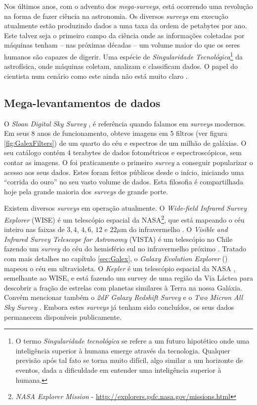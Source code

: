 Nos últimos anos, com o advento dos {\em mega-surveys}, está ocorrendo uma
revolução na forma de fazer ciência na astronomia. Os diversos {\em surveys} em
execução atualmente estão produzindo dados a uma taxa da ordem de petabytes por
ano. Este talvez seja o primeiro campo da ciência onde as informações coletadas
por máquinas tenham -- nas próximas décadas -- um volume maior do que os seres
humanos são capazes de digerir. Uma espécie de {\em Singularidade
Tecnológica}\footnote{O termo {\em Singularidade tecnológica} se refere a um
futuro hipotético onde uma inteligência superior à humana emerge através da
tecnologia. Qualquer previsão após tal fato se torna muito difícil, algo similar
a um horizonte de eventos, dada a dificuldade em entender uma inteligência
superior à humana.} da astrofísica, onde máquinas coletam, analizam e
classificam dados. O papel do cientista num cenário como este ainda não está
muito claro \citep{Norris2010}.

\subsection{Mega-levantamentos de dados}

O {\em Sloan Digital Sky Survey} \citep[\SDSS; ][]{York2000}, é referência
quando falamos em {\em surveys} modernos. Em seus 8 anos de funcionamento, obteve
imagens em 5 filtros (ver figura \ref{fig:GalexFilters}) de um quarto do céu e
espectros de um milhão de galáxias. O seu catálogo contém 4 terabytes de dados
fotométricos e espectroscópicos, sem contar as imagens. O \SDSS foi praticamente
o primeiro {\em survey} a conseguir popularizar o acesso aos seus dados. Estes
foram feitos públicos desde o início, iniciando uma ``corrida do ouro'' no seu
vasto volume de dados. Esta filosofia é compartilhada hoje pela grande maioria
dos {\em surveys} de grande porte.

Existem diversos {\em surveys} em operação atualmente. O {\em Wide-field
Infrared Survey Explorer} (WISE) é um telescópio espacial da NASA\footnote{{\em
NASA Explorer Mission} - \url{http://explorers.gsfc.nasa.gov/missions.html}},
que está mapeando o céu inteiro nas faixas de $3,4$, $4,6$, $12$ e $22\mu$m do
infravermelho \citep{Wright2010}. O {\em Visible and Infrared Survey Telescope
for Astronomy} (VISTA) é um telescópio no Chile fazendo um {\em survey} do céu
do hemisfério sul no infravermelho próximo \citep{Born2010}. Tratado com mais
detalhes no capítulo \ref{sec:Galex}, o {\em Galaxy Evolution Explorer} (\galex)
mapeou o céu em ultravioleta. O {\em Kepler} é um telescópio espacial da NASA
\citep{Borucki2010}, semelhante ao WISE, e está fazendo um survey de uma região
da Via Láctea para descobrir a fração de estrelas com planetas similares à Terra
na nossa Galáxia. Convém mencionar também o {\em 2dF Galaxy Redshift Survey}
\citep[2dFGRS;][]{Colless1999} e o {\em Two Micron All Sky Survey}
\citep[2MASS;][]{Skrutskie2006}. Embora estes {\em surveys} já tenham sido
concluídos, os seus dados permanecem disponíveis publicamente.

